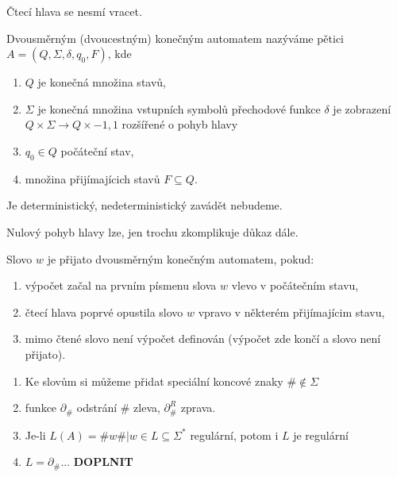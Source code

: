 \documentclass[../main.tex]{subfiles}
\begin{document}
Čtecí hlava se nesmí vracet.

\begin{definition}
    Dvousměrným (dvoucestným) konečným automatem nazýváme pětici $A = (Q,\Sigma, \delta, q_0,F)$, kde
    \begin{enumerate}
        \item $Q$ je konečná množina stavů,
        \item $\Sigma$ je konečná množina vstupních symbolů přechodové funkce $\delta$ je zobrazení $Q \times \Sigma \rightarrow Q \times {-1,1}$ rozšířené o pohyb hlavy
        \item $q_0 \in Q$ počáteční stav,
        \item množina přijímajícich stavů $F \subseteq Q$.
    \end{enumerate}
    \begin{remark}
        Je deterministický, nedeterministický zavádět nebudeme.
    \end{remark}
    \begin{remark}
        Nulový pohyb hlavy lze, jen trochu zkomplikuje důkaz dále.
    \end{remark}
\end{definition}
\begin{definition}
    Slovo $w$ je přijato dvousměrným konečným automatem, pokud:
    \begin{enumerate}
        \item výpočet začal na prvním písmenu slova $w$ vlevo v počátečním stavu,
        \item čtecí hlava poprvé opustila slovo $w$ vpravo v některém přijímajícim stavu,
        \item mimo čtené slovo není výpočet definován (výpočet zde končí a slovo není přijato).
    \end{enumerate}
    \begin{remark}
        \begin{enumerate}
            \item Ke slovům si můžeme přidat speciální koncové znaky $\# \notin \Sigma$
            \item funkce $\partial_{\#}$ odstrání $\#$ zleva, $\partial^R_{\#}$ zprava.
            \item Je-li $L(A) = {\#w\#|w\in L \subseteq \Sigma^*}$ regulární, potom i $L$ je regulární
            \item $L = \partial_{\#}$... \textbf{DOPLNIT}
        \end{enumerate}
    \end{remark}
\end{definition}
\end{document}
